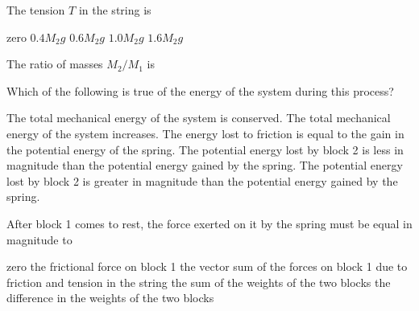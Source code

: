 \documentclass[12pt]{../../oss-classkick-exam}
\begin{document}
\begin{questions}
  \question The tension $T$ in the string is \label{connect1}
  \begin{choices}
    \choice zero
    \choice $0.4M_2g$
    \choice $0.6M_2g$
    \choice $1.0M_2g$
    \choice $1.6M_2g$
  \end{choices}
  
  \question The ratio of masses $M_2/M_1$ is  \label{connect2}
  \begin{choices}
  \end{choices}
  

  \question Which of the following is true of the energy of the system during
  this process?
  \begin{choices}
    \choice The total mechanical energy of the system is conserved.
    \choice The total mechanical energy of the system increases.
    \choice The energy lost to friction is equal to the gain in the potential
    energy of the spring.
    \choice  The potential energy lost by block 2 is less in magnitude than the
    potential energy gained by the spring.
    \choice The potential energy lost by block 2 is greater in magnitude than
    the potential energy gained by the spring.
  \end{choices}
  \label{spring1}

  \question After block 1 comes to rest, the force exerted on it by the spring
  must be equal in magnitude to
  \begin{choices}
    \choice zero
    \choice the frictional force on block 1
    \choice the vector sum of the forces on block 1 due to friction and tension
    in the string
    \choice the sum of the weights of the two blocks
    \choice the difference in the weights of the two blocks
  \end{choices}
  \label{spring2}
  

\end{questions}
\end{document}

